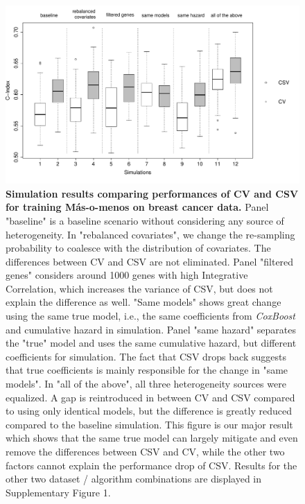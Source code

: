 \documentclass{bioinfo}
\begin{document}
  \begin{figure}[htp]
     \centering
     \includegraphics[width=16cm]{boxplot_breast_masomenos_withnames.pdf}
     \caption{\textbf{Simulation results comparing performances of CV and CSV for training M\'{a}s-o-menos on breast cancer data.} Panel "baseline" is a baseline scenario without considering any source of heterogeneity. In "rebalanced covariates", we change the re-sampling probability to coalesce with the distribution of covariates. The differences between CV and CSV are not eliminated. Panel "filtered genes" considers around 1000 genes with high Integrative Correlation, which increases the variance of CSV, but does not explain the difference as well. "Same models" shows great change using the same true model, i.e., the same coefficients from \emph{CoxBoost} and cumulative hazard in simulation. %
         Panel "same hazard" separates the "true" model and uses the same cumulative hazard, but different coefficients for simulation. The fact that CSV drops back suggests that true coefficients is mainly responsible for the change in "same models". In "all of the above", all three heterogeneity sources were equalized. A gap is reintroduced in between CV and CSV compared to using only identical models, but the difference is greatly reduced compared to the baseline simulation. This figure is our major result which shows that the same true model can largely mitigate and even remove the differences between CSV and CV, while the other two factors cannot explain the performance drop of CSV. Results for the other two dataset / algorithm combinations are displayed in Supplementary Figure 1.}
     \label{boxplot_breast_masomenos}
  \end{figure}
\end{document}
